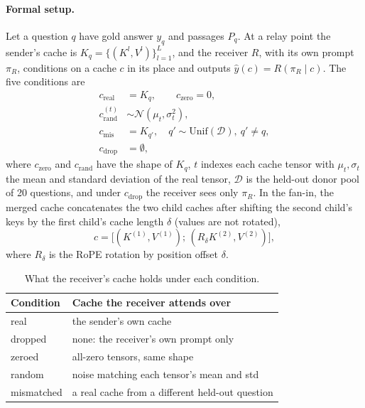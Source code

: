 \documentclass[11pt]{article}
\begin{document}
\paragraph{Formal setup.} Let a question $q$ have gold answer $y_q$ and passages $P_q$. At a relay
point the sender's cache is $K_q=\{(K^{l},V^{l})\}_{l=1}^{L}$, and the receiver $R$, with its own prompt
$\pi_R$, conditions on a cache $c$ in its place and outputs $\hat y(c)=R(\pi_R\mid c)$. The five conditions are
\begin{align*}
c_{\mathrm{real}} &= K_q, \qquad c_{\mathrm{zero}} = 0,\\
c_{\mathrm{rand}}^{(t)} &\sim \mathcal{N}(\mu_t,\sigma_t^{2}),\\
c_{\mathrm{mis}} &= K_{q'},\quad q'\sim\mathrm{Unif}(\mathcal{D}),\ q'\neq q,\\
c_{\mathrm{drop}} &= \emptyset,
\end{align*}
where $c_{\mathrm{zero}}$ and $c_{\mathrm{rand}}$ have the shape of $K_q$, $t$ indexes each cache tensor with
$\mu_t,\sigma_t$ the mean and standard deviation of the real tensor, $\mathcal{D}$ is the held-out donor pool
of 20 questions, and under $c_{\mathrm{drop}}$ the receiver sees only $\pi_R$. In the fan-in, the merged cache concatenates the two child caches after shifting the second
child's keys by the first child's cache length $\delta$ (values are not rotated),
\[
c=\bigl[(K^{(1)},V^{(1)});\,(R_{\delta}K^{(2)},V^{(2)})\bigr],
\]
where $R_{\delta}$ is the RoPE rotation by position offset $\delta$.

\begin{table}[t]
\centering
\small
\caption{What the receiver's cache holds under each condition.}
\label{tab:conditions}
\begin{tabular}{lp{5.2cm}}
\toprule
\textbf{Condition} & \textbf{Cache the receiver attends over} \\
\midrule
real       & the sender's own cache \\
dropped    & none: the receiver's own prompt only \\
zeroed     & all-zero tensors, same shape \\
random     & noise matching each tensor's mean and std \\
mismatched & a real cache from a different held-out question \\
\bottomrule
\end{tabular}
\end{table}
\end{document}
